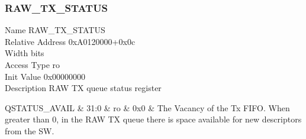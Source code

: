 \documentclass[10pt,a4paper]{paper}
\begin{document}
\subsubsection{RAW\_TX\_STATUS} \label{reg:raw_tx_status}
\begin{regdescription}
	Name			\> RAW\_TX\_STATUS\\
	Relative Address	\> 0xA0120000+0x0c\\
	Width			 bits\\
	Access Type		\> ro\\
	Init Value		\> 0x00000000\\
	Description		\> RAW TX queue status register\\
\end{regdescription}
\begin{regdetails}
	\hline QSTATUS\_AVAIL & 31:0 & ro & 0x0 & The Vacancy of the Tx FIFO. When greater than 0, in the RAW TX
	queue there is space available for new descriptors from the SW.\\
\end{regdetails}
\end{document}
